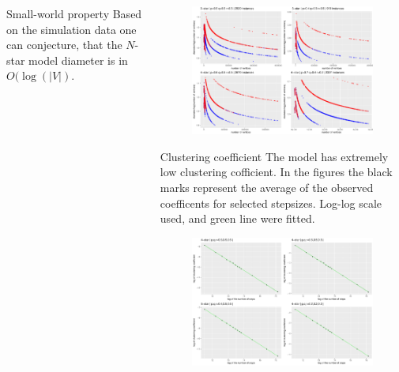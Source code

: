 \documentclass[final]{beamer}
\newlength{\onecolwid}
\newlength{\twocolwid}
\begin{document}
\begin{frame}[t]
\begin{columns}[t]
\begin{column}{\twocolwid}
\begin{columns}[t,totalwidth=\twocolwid]
\begin{column}{\onecolwid}
\begin{block}{Small-world property}\small
Based on the simulation data one can conjecture, that the $N$-star model 
diameter is in $O(\log(|V|)$.
\end{block}


 
\end{column} %


\begin{column}{\onecolwid}\vspace{-.6in} %
\begin{block}{}\small
\begin{figure}
  \includegraphics[width=0.8\linewidth]{./fig/csilldiam4.pdf}
\end{figure}
\end{block}


\begin{block}{Clustering coefficient}\small
The model has extremely low clustering cofficient. In the figures the black 
marks represent the average of the observed coefficents for selected stepsizes. 
Log-log scale used, and green line were fitted. 
\vskip 2cm
\begin{figure}
  \includegraphics[width=0.8\linewidth]{./fig/csillclustlog4.pdf}
\end{figure}
\end{block}


\end{column}
\end{columns}
\end{column}
\end{columns}
\end{frame}
\end{document}
